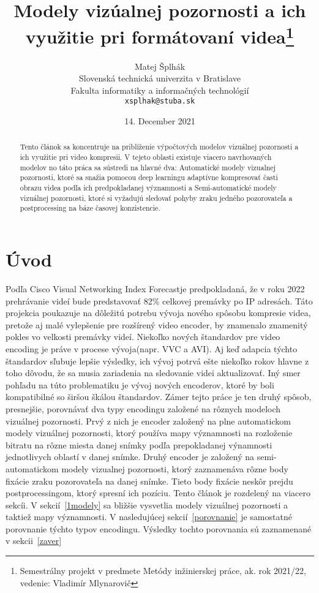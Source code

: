 \documentclass[10pt,twoside,slovak,a4paper]{article}
\title{Modely vizúalnej pozornosti a ich využitie pri formátovaní videa\thanks{Semestrálny projekt v predmete Metódy inžinierskej práce, ak. rok 2021/22, vedenie: Vladimír Mlynarovič}} %
\author{Matej Šplhák\\[2pt]
	{\small Slovenská technická univerzita v Bratislave}\\
	{\small Fakulta informatiky a informačných technológií}\\
	{\small \texttt{xsplhak@stuba.sk}}
	}
\date{\small 14. December 2021} %
\begin{document}
\maketitle
\begin{abstract}
Tento článok sa koncentruje na priblíženie výpočtových modelov vizuálnej pozornosti a ich využitie pri video kompresii. V tejeto oblasti existuje viacero navrhovaných modelov no táto práca sa sústredi na hlavné dva: Automatické modely vizualnej pozornosti, ktoré sa snažia pomocou deep learningu adaptívne kompresovať časti obrazu videa podľa ich predpokladanej významnosti a Semi-automatické modely vizuálnej pozornosti, ktoré  si vyžadujú sledovať pohyby zraku jedného pozorovateľa a postprocessing na báze časovej konzistencie. 
\end{abstract}


\section{Úvod}
Podľa Cisco  Visual  Networking  Index  Forecast\cite{cisco:forecast}je predpokladaná, že v roku 2022 prehrávanie videí bude predstavovať 82\% celkovej premávky po IP adresách. Táto projekcia poukazuje na dôležitú potrebu vývoja nového spôsobu kompresie videa, pretože aj malé vylepšenie pre rozšírený video encoder, by znamenalo znamenitý pokles vo velkosti premávky videí. Niekoľko nových štandardov pre video encoding je práve v procese vývoja(napr. VVC a AVI). Aj keď adapcia týchto štandardov sľubuje lepšie výsledky, ich vývoj potrvá ešte niekoľko rokov hlavne z toho dôvodu, že sa musia zariadenia na sledovanie videi aktualizovať. Iný smer pohľadu na túto problematiku je vývoj nových encoderov, ktoré by boli kompatibilné so širšou škálou štandardov. Zámer tejto práce je ten druhý spôsob, presnejšie, porovnávať dva typy encodingu založené na rôznych modeloch vizuálnej pozornosti. Prvý z nich\cite{Czarnecki:Progress} je encoder založený na plne automatickom modely vizuálnej pozornosti, ktorý používa mapy významnosti na rozloženie bitratu na rôzne miesta danej snímky podľa prepokladanej výnamnosti jednotlivych oblastí v danej snímke. Druhý encoder\cite{Coplien:MPD} je založený na semi-automatickom modely vizualnej pozornosti, ktorý zaznamenáva rôzne body fixácie zraku pozorovateľa na danej snímke. Tieto body fixácie neskôr prejdu postprocessingom, ktorý spresní ich pozíciu. Tento článok je rozdelený na viacero sekcíi. V sekcií~\ref{1modely} sa bližšie vysvetlia modely vizuálnej pozornosti a taktiež mapy významnosti. V nasledujúcej sekcií~\ref{porovnanie} je samostatné porovnanie týchto typov encodingu. Výsledky tochto porovnania sú zaznamenané v sekcii~\ref{zaver}   
\end{document}
